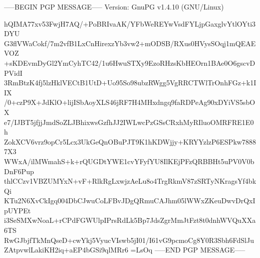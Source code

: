 -----BEGIN PGP MESSAGE-----
Version: GnuPG v1.4.10 (GNU/Linux)

hQIMA77xv53FwjH7AQ/+PoBRIvaAK/YFbWeREYwVsdFYLjpGaxglvYtlOYti3DYU
G3flVWaCokf/7m2vfB1LxCnHirexzYb3vw2+mODSB/RXus0HVysSOqj1mQEAEVOZ
+sKDEvmDyGl2YmCyhTC42/1u6HwuSTXy9EzoRHzsKbHEOrn1BAe0O6gscvDPVidI
3RmBtzK4fj5lzHklVECtB1UtD+Uo95So98ubzRWgg5VgRRCTWlTrOnhFGz+k1IIX
/0+czP9X+JdKlO+lijISbAoyXLS46jRF7H4MHxdngq9faRDPeAg90xDYiVS5sbOX
e7/IJBT5jfjjJmdSoZLJBhixwsGzfhJJ2IWLwcPzGSsCRxhMyRIluoOMRFRE1E0h
ZokXCV6vrz9opCr5Lcx3UkGeQnOBuPJT9K1hKDWjjy+KRYYzlzP6ESPkw78887X3
WWxA/ilMWmahS+k+rQUGDtYWE1cvYFyfYU8IlKEjPFzQRBBHt5uPV0V0bDnF6Pup
thlCCzv1VBZUMYxN+vF+RlkRgLxwjzAeLu8o4TrgRkmV87zSRTyNKragsYf4bkQi
KTu2N6XvCkIgq004DbCJwuCoLFBvJDgQRmuCAJhm05lWWxZKeuDwvDrQxIpUYPEt
i3SeSMXwNoaL+rCPdFGWUlpIPrsRdLk5Bp7JdsZgrMmJtFzt8t0dnhWVQuXXa6TS
RwGJbjfTkMnQseD+cwYkj5VyucVIswb5jI01/I61vG9pcmoCg8Y0R3Sbh6FdSlJu
ZAtpvwlLakiKH2iq+aEP4bGSi9qlMRr6
=LsOq
-----END PGP MESSAGE-----
